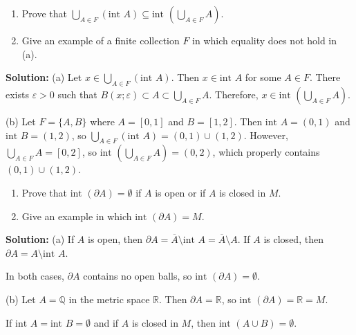 \begin{problembox}
\begin{enumerate}[label=\alph*)]
\item Prove that \(\bigcup_{A \in F} (\text{int } A) \subseteq \text{int } \left(\bigcup_{A \in F} A\right)\).
\item Give an example of a finite collection \( F \) in which equality does not hold in (a).
\end{enumerate}
\end{problembox}

\textbf{Solution:} 
(a) Let $x \in \bigcup_{A \in F} (\text{int } A)$. Then $x \in \text{int } A$ for some $A \in F$. There exists $\varepsilon > 0$ such that $B(x;\varepsilon) \subset A \subset \bigcup_{A \in F} A$. Therefore, $x \in \text{int }(\bigcup_{A \in F} A)$.

(b) Let $F = \{A, B\}$ where $A = [0,1]$ and $B = [1,2]$. Then $\text{int } A = (0,1)$ and $\text{int } B = (1,2)$, so $\bigcup_{A \in F} (\text{int } A) = (0,1) \cup (1,2)$. However, $\bigcup_{A \in F} A = [0,2]$, so $\text{int }(\bigcup_{A \in F} A) = (0,2)$, which properly contains $(0,1) \cup (1,2)$.

\begin{problembox}
\begin{enumerate}[label=\alph*)]
\item Prove that \(\text{int } (\partial A) = \emptyset\) if \( A \) is open or if \( A \) is closed in \( M \).
\item Give an example in which \(\text{int } (\partial A) = M\).
\end{enumerate}
\end{problembox}

\textbf{Solution:} 
(a) If $A$ is open, then $\partial A = \overline{A} \setminus \text{int } A = \overline{A} \setminus A$. If $A$ is closed, then $\partial A = A \setminus \text{int } A$.

In both cases, $\partial A$ contains no open balls, so $\text{int } (\partial A) = \emptyset$.

(b) Let $A = \mathbb{Q}$ in the metric space $\mathbb{R}$. Then $\partial A = \mathbb{R}$, so $\text{int } (\partial A) = \mathbb{R} = M$.

\begin{problembox}
If \(\text{int } A = \text{int } B = \emptyset\) and if \(A\) is closed in \(M\), then \(\text{int } (A \cup B) = \emptyset\).
\end{problembox}


